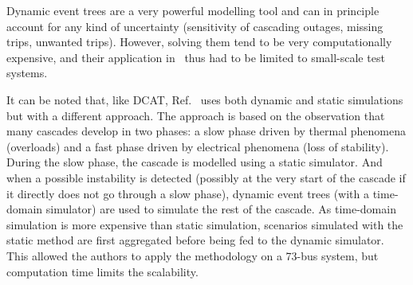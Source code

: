 

Dynamic event trees are a very powerful modelling tool and can in principle account for any kind of uncertainty (sensitivity of cascading outages, missing trips, unwanted trips). However, solving them tend to be very computationally expensive, and their application in~\cite{TwoLevelPSA, Faghihi, PierreMCDETprelim} thus had to be limited to small-scale test systems.


It can be noted that, like DCAT, Ref.~\cite{TwoLevelPSA} uses both dynamic and static simulations but with a different approach. The approach is based on the observation that many cascades develop in two phases: a slow phase driven by thermal phenomena (overloads) and a fast phase driven by electrical phenomena (loss of stability). During the slow phase, the cascade is modelled using a static simulator. And when a possible instability is detected (possibly at the very start of the cascade if it directly does not go through a slow phase), dynamic event trees (with a time-domain simulator) are used to simulate the rest of the cascade. As time-domain simulation is more expensive than static simulation, scenarios simulated with the static method are first aggregated before being fed to the dynamic simulator. This allowed the authors to apply the methodology on a 73-bus system, but computation time limits the scalability.

